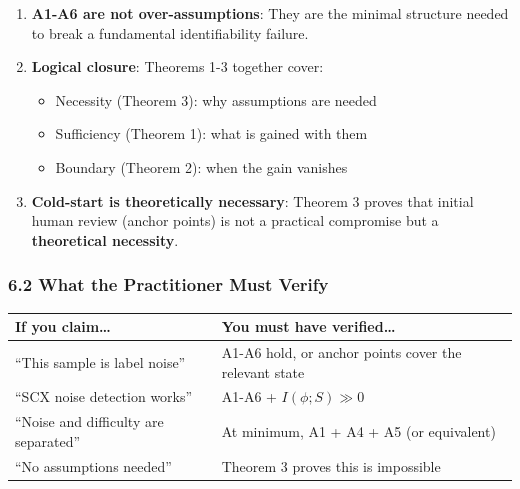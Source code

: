 \documentclass[
  12pt,
]{ctexart}
\providecommand{\tightlist}{%
  \setlength{\itemsep}{0pt}\setlength{\parskip}{0pt}}
\begin{document}
\begin{enumerate}
\def\labelenumi{\arabic{enumi}.}
\tightlist
\item
  \textbf{A1-A6 are not over-assumptions}: They are the minimal
  structure needed to break a fundamental identifiability failure.
\item
  \textbf{Logical closure}: Theorems 1-3 together cover:

  \begin{itemize}
  \tightlist
  \item
    Necessity (Theorem 3): why assumptions are needed
  \item
    Sufficiency (Theorem 1): what is gained with them
  \item
    Boundary (Theorem 2): when the gain vanishes
  \end{itemize}
\item
  \textbf{Cold-start is theoretically necessary}: Theorem 3 proves that
  initial human review (anchor points) is not a practical compromise but
  a \textbf{theoretical necessity}.
\end{enumerate}

\subsubsection{6.2 What the Practitioner Must
Verify}\label{what-the-practitioner-must-verify}

\begin{longtable}[]{@{}
  >{\raggedright\arraybackslash}p{}
  >{\raggedright\arraybackslash}p{}@{}}
\toprule\noalign{}
\begin{minipage}[b]{\linewidth}\raggedright
If you claim\ldots{}
\end{minipage} & \begin{minipage}[b]{\linewidth}\raggedright
You must have verified\ldots{}
\end{minipage} \\
\midrule\noalign{}
\endhead
\bottomrule\noalign{}
\endlastfoot
``This sample is label noise'' & A1-A6 hold, or anchor points cover the
relevant state \\
``SCX noise detection works'' & A1-A6 + \(I(\phi; S) \gg 0\) \\
``Noise and difficulty are separated'' & At minimum, A1 + A4 + A5 (or
equivalent) \\
``No assumptions needed'' & Theorem 3 proves this is impossible \\
\end{longtable}
\end{document}
